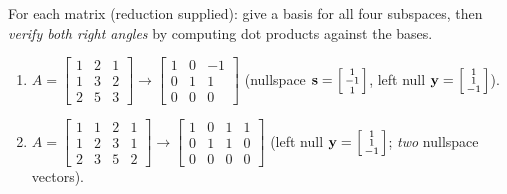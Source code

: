 \documentclass[10pt]{article}
\newcommand{\yy}{\mathbf{y}}
\newcommand{\svec}{\mathbf{s}}
\begin{document}
\begin{tcolorbox}[colback=white, colframe=black!40, title=\textbf{Tier A --- Approaching Proficiency},
    fonttitle=\bfseries, arc=1.5mm, left=3mm, right=3mm, top=2mm, bottom=2mm, breakable]
For each matrix (reduction supplied): give a basis for all four subspaces, then \emph{verify both right
angles} by computing dot products against the bases.
\begin{enumerate}[leftmargin=1.7em, itemsep=9pt]
  \item $A=\begin{bmatrix} 1 & 2 & 1 \\ 1 & 3 & 2 \\ 2 & 5 & 3 \end{bmatrix}
        \longrightarrow \begin{bmatrix} 1 & 0 & -1 \\ 0 & 1 & 1 \\ 0 & 0 & 0 \end{bmatrix}$
        \; (nullspace $\svec=\begin{bsmallmatrix} 1\\-1\\1 \end{bsmallmatrix}$, left null
        $\yy=\begin{bsmallmatrix} 1\\1\\-1 \end{bsmallmatrix}$). 
  \item $A=\begin{bmatrix} 1 & 1 & 2 & 1 \\ 1 & 2 & 3 & 1 \\ 2 & 3 & 5 & 2 \end{bmatrix}
        \longrightarrow \begin{bmatrix} 1 & 0 & 1 & 1 \\ 0 & 1 & 1 & 0 \\ 0 & 0 & 0 & 0 \end{bmatrix}$
        \; (left null $\yy=\begin{bsmallmatrix} 1\\1\\-1 \end{bsmallmatrix}$; \emph{two} nullspace
        vectors). 
\end{enumerate}
\end{tcolorbox}
\end{document}
